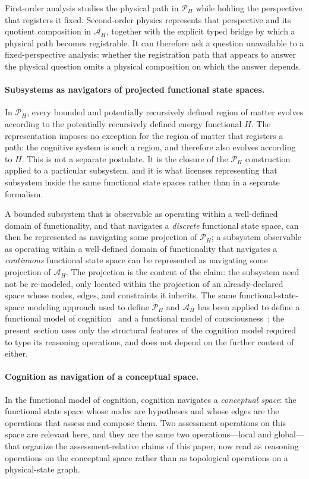 \documentclass[10pt,twoside,a5paper]{article}
\newcommand{\Pspace}{\ensuremath{\mathcal P_H}}
\newcommand{\ARspace}{\ensuremath{\mathcal A_H}}
\theoremstyle{definition}
\begin{document}
First-order analysis studies the physical path in $\Pspace$ while holding the
perspective that registers it fixed. Second-order physics represents that
perspective and its quotient composition in $\ARspace$, together with the explicit
typed bridge by which a physical path becomes registrable. It can therefore ask a
question unavailable to a fixed-perspective analysis: whether the registration path
that appears to answer the physical question omits a physical composition on which
the answer depends.

\paragraph{Subsystems as navigators of projected functional state spaces.}
In $\Pspace$, every bounded and potentially recursively defined region of matter
evolves according to the potentially recursively defined energy functional $H$. The
representation imposes no exception for the region of matter that registers a path:
the cognitive system is such a region, and therefore also evolves according to $H$.
This is not a separate postulate. It is the closure of the $\Pspace$ construction
applied to a particular subsystem, and it is what licenses representing that subsystem
inside the same functional state spaces rather than in a separate formalism.

A bounded subsystem that is observable as operating within a well-defined domain of
functionality, and that navigates a \emph{discrete} functional state space, can then
be represented as navigating some projection of $\Pspace$; a subsystem observable as
operating within a well-defined domain of functionality that navigates a
\emph{continuous} functional state space can be represented as navigating some
projection of $\ARspace$. The projection is the content of the claim: the subsystem
need not be re-modeled, only located within the projection of an already-declared
space whose nodes, edges, and constraints it inherits. The same functional-state-space
modeling approach used to define $\Pspace$ and $\ARspace$ has been applied to define a
functional model of cognition~\cite{williams2026cognition} and a functional model of
consciousness~\cite{williams2026consciousness}; the present section uses only the
structural features of the cognition model required to type its reasoning operations,
and does not depend on the further content of either.

\paragraph{Cognition as navigation of a conceptual space.}
In the functional model of cognition, cognition navigates a \emph{conceptual space}:
the functional state space whose nodes are hypotheses and whose edges are the
operations that assess and compose them. Two assessment operations on this space are
relevant here, and they are the same two operations---local and global---that organize
the assessment-relative claims of this paper, now read as reasoning operations on the
conceptual space rather than as topological operations on a physical-state graph.
\end{document}
